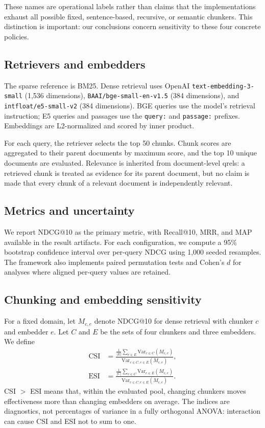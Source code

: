 \documentclass[10pt,letterpaper]{article}
\begin{document}
These names are operational labels rather than claims that the implementations exhaust all
possible fixed, sentence-based, recursive, or semantic chunkers. This distinction is important:
our conclusions concern sensitivity to these four concrete policies.

\subsection{Retrievers and embedders}

The sparse reference is BM25. Dense retrieval uses OpenAI
\texttt{text-embedding-3-small} (1,536 dimensions),
\texttt{BAAI/bge-small-en-v1.5} (384 dimensions), and
\texttt{intfloat/e5-small-v2} (384 dimensions). BGE queries use the model's retrieval instruction;
E5 queries and passages use the \texttt{query:} and \texttt{passage:} prefixes. Embeddings are
L2-normalized and scored by inner product.

For each query, the retriever selects the top 50 chunks. Chunk scores are aggregated to their parent
documents by maximum score, and the top 10 unique documents are evaluated. Relevance is inherited
from document-level qrels: a retrieved chunk is treated as evidence for its parent document, but no
claim is made that every chunk of a relevant document is independently relevant.

\subsection{Metrics and uncertainty}

We report NDCG@10 as the primary metric, with Recall@10, MRR, and MAP available in the result
artifacts. For each configuration, we compute a 95\% bootstrap confidence interval over per-query
NDCG using 1,000 seeded resamples. The framework also implements paired permutation tests and
Cohen's $d$ for analyses where aligned per-query values are retained.

\subsection{Chunking and embedding sensitivity}
\label{sec:indices}

For a fixed domain, let $M_{c,e}$ denote NDCG@10 for dense retrieval with chunker $c$ and
embedder $e$. Let $C$ and $E$ be the sets of four chunkers and three embedders. We define
\begin{align}
\mathrm{CSI} &=
\frac{\frac{1}{|E|}\sum_{e\in E}\mathrm{Var}_{c\in C}(M_{c,e})}
     {\mathrm{Var}_{c\in C,e\in E}(M_{c,e})}, \\
\mathrm{ESI} &=
\frac{\frac{1}{|C|}\sum_{c\in C}\mathrm{Var}_{e\in E}(M_{c,e})}
     {\mathrm{Var}_{c\in C,e\in E}(M_{c,e})}.
\end{align}
CSI $>$ ESI means that, within the evaluated pool, changing chunkers moves effectiveness more
than changing embedders on average. The indices are diagnostics, not percentages of variance in a
fully orthogonal ANOVA: interaction can cause CSI and ESI not to sum to one.
\end{document}

